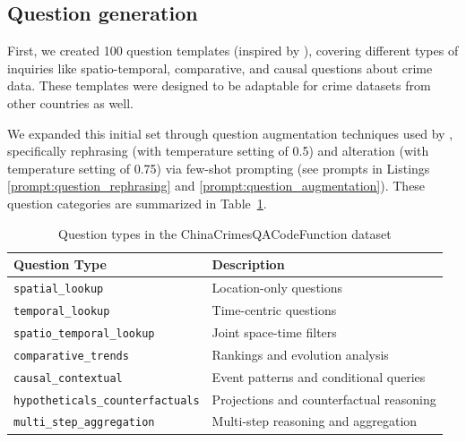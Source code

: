 \subsection{Question generation}

First, we created 100 question templates (inspired by \citep{Dai2024QASTKG, Contractor2020QATourism}), covering different types of inquiries like spatio-temporal, comparative, and causal questions about crime data. These templates were designed to be adaptable for crime datasets from other countries as well.

We expanded this initial set through question augmentation techniques used by \cite{Yin2024MuMathCode, Li2024MuggleMath, Jain2024MetaFineTuning}, specifically rephrasing (with temperature setting of 0.5) and alteration (with temperature setting of 0.75) via few-shot prompting (see prompts in Listings \ref{prompt:question_rephrasing} and \ref{prompt:question_augmentation}). These question categories are summarized in Table~\ref{tab:question_types}. %


\begin{table}[H]
\centering
\footnotesize
\small
\begin{tabular}{ll}
  \toprule
\textbf{Question Type} & \textbf{Description} \\
\midrule
\texttt{spatial\_lookup} & Location-only questions \\
\texttt{temporal\_lookup} & Time-centric questions \\
\texttt{spatio\_temporal\_lookup} & Joint space-time filters \\
\texttt{comparative\_trends} & Rankings and evolution analysis \\
\texttt{causal\_contextual} & Event patterns and conditional queries \\
\texttt{hypotheticals\_counterfactuals} & Projections and counterfactual reasoning \\
\texttt{multi\_step\_aggregation} & Multi-step reasoning and aggregation \\
\bottomrule
\end{tabular}
\caption{Question types in the ChinaCrimesQACodeFunction dataset}
\label{tab:question_types}
\end{table}

